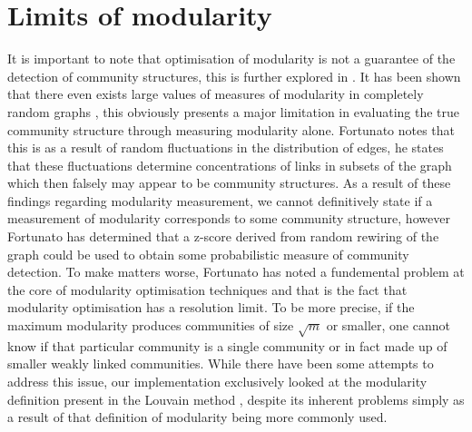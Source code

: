 \section{Limits of modularity}
It is important to note that optimisation of modularity is not a guarantee of the detection of community structures, this is further explored in \cite{fortunato2010community}. It has been shown that there even exists large values of measures of modularity in completely random graphs \cite{guimera2004modularity, reichardt2006statistical}, this obviously presents a major limitation in evaluating the true community structure through measuring modularity alone. Fortunato notes that this is as a result of random fluctuations in the distribution of edges, he states that these fluctuations determine concentrations of links in subsets of the graph which then falsely may appear to be community structures. As a result of these findings regarding modularity measurement, we cannot definitively state if a measurement of modularity corresponds to some community structure, however Fortunato has determined that a z-score derived from random rewiring of the graph could be used to obtain some probabilistic measure of community detection. To make matters worse, Fortunato has noted a fundemental problem at the core of modularity optimisation techniques and that is the fact that modularity optimisation has a resolution limit. To be more precise, if the maximum modularity produces communities of size $\sqrt{m}$ or smaller, one cannot know if that particular community is a single community or in fact made up of smaller weakly linked communities. While there have been some attempts to address this issue, our implementation exclusively looked at the modularity definition present in the Louvain method \cite{blondel2008fast}, despite its inherent problems simply as a result of that definition of modularity being more commonly used. 
